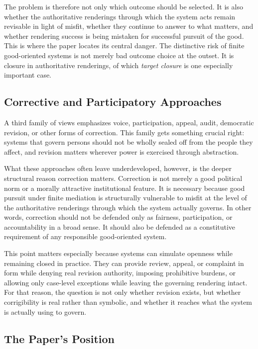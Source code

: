 \documentclass[11pt]{article}
\renewcommand{\emph}[1]{\textit{#1}}
\begin{document}
The problem is therefore not only which outcome should be selected. It is also whether the authoritative renderings through which the system acts remain revisable in light of misfit, whether they continue to answer to what matters, and whether rendering success is being mistaken for successful pursuit of the good. This is where the paper locates its central danger. The distinctive risk of finite good-oriented systems is not merely bad outcome choice at the outset. It is closure in authoritative renderings, of which \emph{target closure} is one especially important case.

\subsection{Corrective and Participatory Approaches}

A third family of views emphasizes voice, participation, appeal, audit, democratic revision, or other forms of correction. This family gets something crucial right: systems that govern persons should not be wholly sealed off from the people they affect, and revision matters wherever power is exercised through abstraction.

What these approaches often leave underdeveloped, however, is the deeper structural reason correction matters. Correction is not merely a good political norm or a morally attractive institutional feature. It is necessary because good pursuit under finite mediation is structurally vulnerable to misfit at the level of the authoritative renderings through which the system actually governs. In other words, correction should not be defended only as fairness, participation, or accountability in a broad sense. It should also be defended as a constitutive requirement of any responsible good-oriented system.\cite{Fricker2007EpistemicInjustice,Haraway1988SituatedKnowledges}

This point matters especially because systems can simulate openness while remaining closed in practice. They can provide review, appeal, or complaint in form while denying real revision authority, imposing prohibitive burdens, or allowing only case-level exceptions while leaving the governing rendering intact. For that reason, the question is not only whether revision exists, but whether corrigibility is real rather than symbolic, and whether it reaches what the system is actually using to govern.

\subsection{The Paper's Position}
\end{document}
